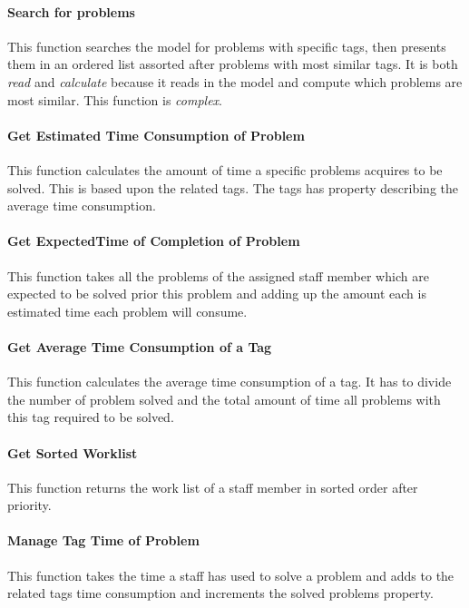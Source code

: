 \paragraph{Search for problems }
This function searches the model for problems with specific tags, then presents them in an ordered list assorted after problems with most similar tags. 
It is both \textit{read} and \textit{calculate} because it reads in the model and compute which problems are most similar. 
This function is \textit{complex}.

\paragraph{Get Estimated Time Consumption of Problem }
This function calculates the amount of time a specific problems acquires to be solved. This is based upon the related tags. 
The tags has property describing the average time consumption.  

\paragraph{Get ExpectedTime of Completion of Problem}
This function takes all the problems of the assigned staff member which are expected to be solved prior this problem and adding up the amount each is estimated time each problem will consume.

\paragraph{Get Average Time Consumption of a Tag }
This function calculates the average time consumption of a tag. 
It has to divide the number of problem solved and the total amount of time all problems with this tag required to be solved. 


\paragraph{Get Sorted Worklist}
This function returns the work list of a staff member in sorted order after priority. 

\paragraph{Manage Tag Time of Problem }
This function takes the time a staff has used to solve a problem and adds to the related tags time consumption and increments the solved problems property. 

